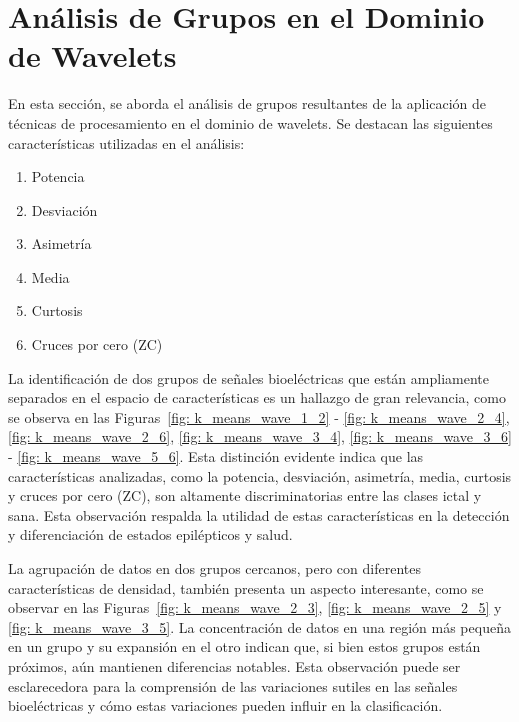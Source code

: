 \section{Análisis de Grupos en el Dominio de Wavelets}
En esta sección, se aborda el análisis de grupos resultantes de la aplicación de técnicas de procesamiento en el dominio de wavelets. Se destacan las siguientes características utilizadas en el análisis:

\begin{enumerate}
    \item Potencia
    \item Desviación
    \item Asimetría
    \item Media
    \item Curtosis
    \item Cruces por cero (ZC)
\end{enumerate}


 La identificación de dos grupos de señales bioeléctricas que están ampliamente separados en el espacio de características es un hallazgo de gran relevancia, como se observa en las Figuras~\ref{fig: k_means_wave_1_2} - \ref{fig: k_means_wave_2_4}, \ref{fig: k_means_wave_2_6}, \ref{fig: k_means_wave_3_4}, \ref{fig: k_means_wave_3_6} - \ref{fig: k_means_wave_5_6}. Esta distinción evidente indica que las características analizadas, como la potencia, desviación, asimetría, media, curtosis y cruces por cero (ZC), son altamente discriminatorias entre las clases ictal y sana. Esta observación respalda la utilidad de estas características en la detección y diferenciación de estados epilépticos y salud.

La agrupación de datos en dos grupos cercanos, pero con diferentes características de densidad, también presenta un aspecto interesante, como se observar en las Figuras~\ref{fig: k_means_wave_2_3}, \ref{fig: k_means_wave_2_5} y \ref{fig: k_means_wave_3_5}. La concentración de datos en una región más pequeña en un grupo y su expansión en el otro indican que, si bien estos grupos están próximos, aún mantienen diferencias notables. Esta observación puede ser esclarecedora para la comprensión de las variaciones sutiles en las señales bioeléctricas y cómo estas variaciones pueden influir en la clasificación.

